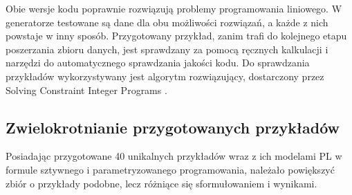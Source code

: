 Obie wersje kodu poprawnie rozwiązują problemy programowania liniowego. W generatorze testowane są dane dla obu możliwości rozwiązań, a każde z nich powstaje w inny sposób. %
Przygotowany przykład, zanim trafi do kolejnego etapu poszerzania zbioru danych, jest sprawdzany za pomocą ręcznych kalkulacji i narzędzi do automatycznego sprawdzania jakości kodu. %
Do sprawdzania przykładów wykorzystywany jest algorytm rozwiązujący, dostarczony przez Solving Constraint Integer Programs \cite{TODO}. %

\subsection{Zwielokrotnianie przygotowanych przykładów}

Posiadając przygotowane 40 unikalnych przykładów wraz z ich modelami PL w formule sztywnego i parametryzowanego programowania, należało powiększyć zbiór o przykłady podobne, lecz różniące się sformułowaniem i wynikami.

